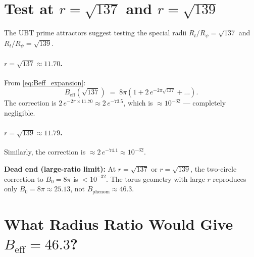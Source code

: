 \documentclass[12pt,a4paper]{article}
\theoremstyle{definition}
\theoremstyle{remark}
\begin{document}
\section{Test at $r = \sqrt{137}$ and $r = \sqrt{139}$}
\label{sec:test_r}

The UBT prime attractors suggest testing the special radii
$R_t / R_\psi = \sqrt{137}$ and $R_t / R_\psi = \sqrt{139}$.

\paragraph{$r = \sqrt{137} \approx 11.70$.}
From \eqref{eq:Beff_expansion}:
\begin{equation}
  B_{\mathrm{eff}}(\sqrt{137})
  \;=\; 8\pi\left(1 + 2\,e^{-2\pi\sqrt{137}} + \ldots\right).
\end{equation}
The correction is $2\,e^{-2\pi\times 11.70} \approx 2\,e^{-73.5}$, which is
$\approx 10^{-32}$ --- completely negligible.

\paragraph{$r = \sqrt{139} \approx 11.79$.}
Similarly, the correction is $\approx 2\,e^{-74.1} \approx 10^{-32}$.

\begin{deadendbox}
\textbf{Dead end (large-ratio limit):}
At $r = \sqrt{137}$ or $r = \sqrt{139}$, the two-circle correction to
$B_0 = 8\pi$ is $< 10^{-32}$.  The torus geometry with large $r$ reproduces
only $B_0 = 8\pi \approx 25.13$, not $B_{\mathrm{phenom}} \approx 46.3$.
\end{deadendbox}

\section{What Radius Ratio Would Give $B_{\mathrm{eff}} = 46.3$?}
\label{sec:required_r}
\end{document}
